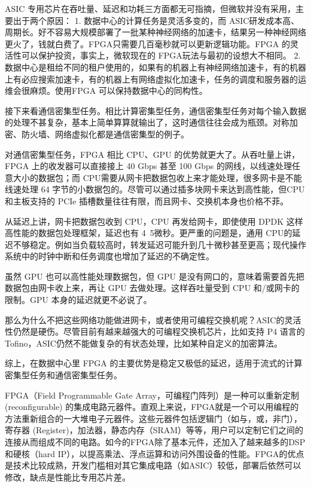 ASIC 专用芯片在吞吐量、延迟和功耗三方面都无可指摘，但微软并没有采用，主要出于两个原因：
1.	数据中心的计算任务是灵活多变的，而 ASIC研发成本高、周期长。好不容易大规模部署了一批某种神经网络的加速卡，结果另一种神经网络更火了，钱就白费了。FPGA只需要几百毫秒就可以更新逻辑功能。FPGA 的灵活性可以保护投资，事实上，微软现在的 FPGA玩法与最初的设想大不相同。
2.	数据中心是租给不同的租户使用的，如果有的机器上有神经网络加速卡，有的机器上有必应搜索加速卡，有的机器上有网络虚拟化加速卡，任务的调度和服务器的运维会很麻烦。使用FPGA 可以保持数据中心的同构性。

接下来看通信密集型任务。相比计算密集型任务，通信密集型任务对每个输入数据的处理不甚复杂，基本上简单算算就输出了，这时通信往往会成为瓶颈。对称加密、防火墙、网络虚拟化都是通信密集型的例子。

对通信密集型任务，FPGA 相比 CPU、GPU 的优势就更大了。从吞吐量上讲，FPGA 上的收发器可以直接接上 40 Gbps 甚至 100 Gbps 的网线，以线速处理任意大小的数据包；而 CPU需要从网卡把数据包收上来才能处理，很多网卡是不能线速处理 64 字节的小数据包的。尽管可以通过插多块网卡来达到高性能，但CPU 和主板支持的 PCIe 插槽数量往往有限，而且网卡、交换机本身也价格不菲。

从延迟上讲，网卡把数据包收到 CPU，CPU 再发给网卡，即使使用 DPDK 这样高性能的数据包处理框架，延迟也有 4~5微秒。更严重的问题是，通用 CPU的延迟不够稳定。例如当负载较高时，转发延迟可能升到几十微秒甚至更高；现代操作系统中的时钟中断和任务调度也增加了延迟的不确定性。

虽然 GPU 也可以高性能处理数据包，但 GPU 是没有网口的，意味着需要首先把数据包由网卡收上来，再让 GPU 去做处理。这样吞吐量受到 CPU 和/或网卡的限制。GPU 本身的延迟就更不必说了。

那么为什么不把这些网络功能做进网卡，或者使用可编程交换机呢？ASIC的灵活性仍然是硬伤。尽管目前有越来越强大的可编程交换机芯片，比如支持 P4 语言的 Tofino，ASIC仍然不能做复杂的有状态处理，比如某种自定义的加密算法。

综上，在数据中心里 FPGA 的主要优势是稳定又极低的延迟，适用于流式的计算密集型任务和通信密集型任务。


FPGA（Field Programmable Gate Array，可编程门阵列）是一种可以重新定制 (reconfigurable) 的集成电路元器件。直观上来说，FPGA就是一个可以用编程的方法重新组合的一大堆电子元器件。这些元器件包括逻辑门（如与，或，非门），寄存器 (Register)，加法器，静态内存（SRAM）等等，用户可以定制它们之间的连接从而组成不同的电路。如今的FPGA除了基本元件，还加入了越来越多的DSP和硬核（hard IP），以提高乘法、浮点运算和访问外围设备的性能。FPGA的优点是技术比较成熟，开发门槛相对其它集成电路（如ASIC）较低，部署后依然可以修改，缺点是性能比专用芯片差。

